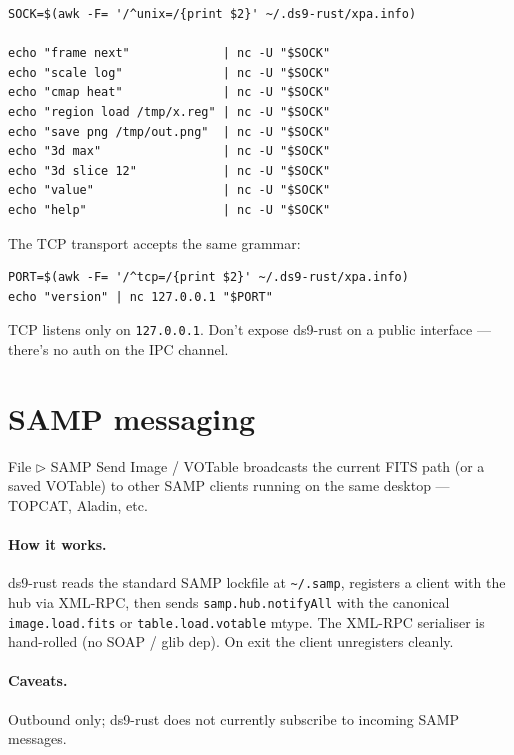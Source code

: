 \documentclass[11pt,a4paper]{article}
\begin{document}
\begin{lstlisting}[language=shell]
SOCK=$(awk -F= '/^unix=/{print $2}' ~/.ds9-rust/xpa.info)

echo "frame next"             | nc -U "$SOCK"
echo "scale log"              | nc -U "$SOCK"
echo "cmap heat"              | nc -U "$SOCK"
echo "region load /tmp/x.reg" | nc -U "$SOCK"
echo "save png /tmp/out.png"  | nc -U "$SOCK"
echo "3d max"                 | nc -U "$SOCK"
echo "3d slice 12"            | nc -U "$SOCK"
echo "value"                  | nc -U "$SOCK"
echo "help"                   | nc -U "$SOCK"
\end{lstlisting}

The TCP transport accepts the same grammar:

\begin{lstlisting}[language=shell]
PORT=$(awk -F= '/^tcp=/{print $2}' ~/.ds9-rust/xpa.info)
echo "version" | nc 127.0.0.1 "$PORT"
\end{lstlisting}

\begin{warnb}
TCP listens only on \texttt{127.0.0.1}. Don't expose ds9-rust on a
public interface --- there's no auth on the IPC channel.
\end{warnb}

\section{SAMP messaging}\label{sec:samp}

\textsf{File $\triangleright$ SAMP Send Image / VOTable} broadcasts the
current FITS path (or a saved VOTable) to other SAMP clients running on
the same desktop --- TOPCAT, Aladin, etc.

\paragraph{How it works.} ds9-rust reads the standard SAMP lockfile at
\texttt{\textasciitilde/.samp}, registers a client with the hub via
XML-RPC, then sends \texttt{samp.hub.notifyAll} with the canonical
\texttt{image.load.fits} or \texttt{table.load.votable} mtype. The XML-RPC
serialiser is hand-rolled (no SOAP / glib dep). On exit the client
unregisters cleanly.

\paragraph{Caveats.} Outbound only; ds9-rust does not currently subscribe
to incoming SAMP messages.
\end{document}
